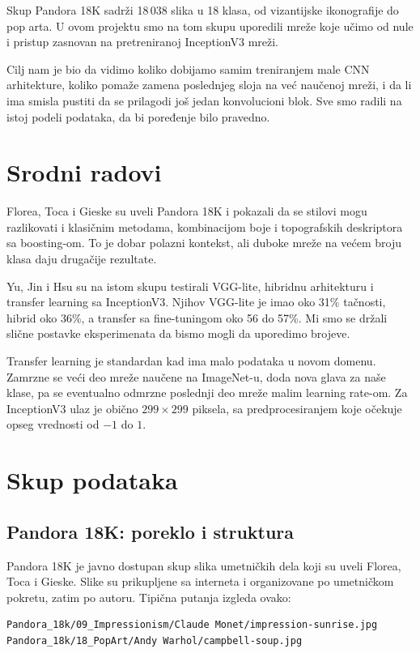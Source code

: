 \documentclass[12pt,a4paper]{article}
\begin{document}
Skup Pandora 18K sadrži 18\,038 slika u 18 klasa, od vizantijske ikonografije do pop arta.
U ovom projektu smo na tom skupu uporedili mreže koje učimo od nule i pristup zasnovan na pretreniranoj InceptionV3 mreži.

Cilj nam je bio da vidimo koliko dobijamo samim treniranjem male CNN arhitekture,
koliko pomaže zamena poslednjeg sloja na već naučenoj mreži,
i da li ima smisla pustiti da se prilagodi još jedan konvolucioni blok.
Sve smo radili na istoj podeli podataka, da bi poređenje bilo pravedno.

\section{Srodni radovi}

Florea, Toca i Gieske su uveli Pandora 18K i pokazali da se stilovi mogu razlikovati i klasičnim metodama,
kombinacijom boje i topografskih deskriptora sa boosting-om.
To je dobar polazni kontekst, ali duboke mreže na većem broju klasa daju drugačije rezultate.

Yu, Jin i Hsu su na istom skupu testirali VGG-lite, hibridnu arhitekturu i transfer learning sa InceptionV3.
Njihov VGG-lite je imao oko 31\% tačnosti, hibrid oko 36\%, a transfer sa fine-tuningom oko 56 do 57\%.
Mi smo se držali slične postavke eksperimenata da bismo mogli da uporedimo brojeve.

Transfer learning je standardan kad ima malo podataka u novom domenu.
Zamrzne se veći deo mreže naučene na ImageNet-u, doda nova glava za naše klase,
pa se eventualno odmrzne poslednji deo mreže malim learning rate-om.
Za InceptionV3 ulaz je obično $299\times 299$ piksela,
sa predprocesiranjem koje očekuje opseg vrednosti od $-1$ do $1$.

\section{Skup podataka}

\subsection{Pandora 18K: poreklo i struktura}

Pandora 18K je javno dostupan skup slika umetničkih dela koji su uveli Florea, Toca i Gieske.
Slike su prikupljene sa interneta i organizovane po umetničkom pokretu, zatim po autoru.
Tipična putanja izgleda ovako:

\begin{lstlisting}
Pandora_18k/09_Impressionism/Claude Monet/impression-sunrise.jpg
Pandora_18k/18_PopArt/Andy Warhol/campbell-soup.jpg
\end{lstlisting}
\end{document}

